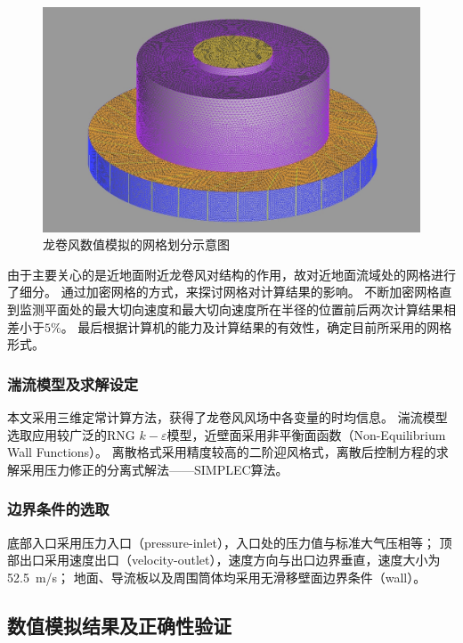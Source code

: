\documentclass{ctexart}
\begin{document}
\begin{figure}[h!]
\centering
\includegraphics[width=\textwidth]{./fig/mesh}
\caption{龙卷风数值模拟的网格划分示意图}
\label{fig:mesh}
\end{figure}

由于主要关心的是近地面附近龙卷风对结构的作用，故对近地面流域处的网格进行了细分。
通过加密网格的方式，来探讨网格对计算结果的影响。
不断加密网格直到监测平面处的最大切向速度和最大切向速度所在半径的位置前后两次计算结果相差小于$5 \%$。
最后根据计算机的能力及计算结果的有效性，确定目前所采用的网格形式。

\subsubsection{湍流模型及求解设定}
本文采用三维定常计算方法，获得了龙卷风风场中各变量的时均信息。
湍流模型选取应用较广泛的RNG $k-\varepsilon$模型，近壁面采用非平衡面函数（Non-Equilibrium Wall Functions）。
离散格式采用精度较高的二阶迎风格式，离散后控制方程的求解采用压力修正的分离式解法——SIMPLEC算法。

\subsubsection{边界条件的选取}
底部入口采用压力入口（pressure-inlet），入口处的压力值与标准大气压相等；
顶部出口采用速度出口（velocity-outlet），速度方向与出口边界垂直，速度大小为\SI{52.5}{m/s}；
地面、导流板以及周围筒体均采用无滑移壁面边界条件（wall）。


\subsection{数值模拟结果及正确性验证}
\end{document}
